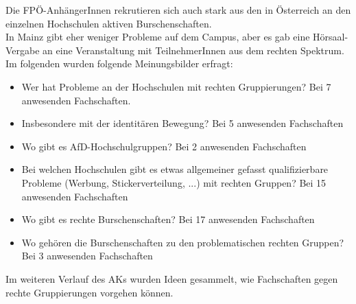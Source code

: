 Die FPÖ-AnhängerInnen rekrutieren sich auch stark aus den in Österreich an den einzelnen Hochschulen aktiven Burschenschaften. \\
In Mainz gibt eher weniger Probleme auf dem Campus, aber es gab eine Hörsaal-Vergabe an eine Veranstaltung mit TeilnehmerInnen aus dem rechten Spektrum. \\
Im folgenden wurden folgende Meinungsbilder erfragt:
\begin{itemize}
\item Wer hat Probleme an der Hochschulen mit rechten Gruppierungen? Bei 7 anwesenden Fachschaften.
\item Insbesondere mit der identitären Bewegung? Bei 5 anwesenden Fachschaften
\item Wo gibt es AfD-Hochschulgruppen? Bei 2 anwesenden Fachschaften
\item Bei welchen Hochschulen gibt es etwas allgemeiner gefasst qualifizierbare Probleme (Werbung, Stickerverteilung, ...) mit rechten Gruppen? Bei 15 anwesenden Fachschaften
\item Wo gibt es rechte Burschenschaften? Bei 17 anwesenden Fachschaften
\item Wo gehören die Burschenschaften zu den problematischen rechten Gruppen? Bei 3 anwesenden Fachschaften
\end{itemize}

Im weiteren Verlauf des AKs wurden Ideen gesammelt, wie Fachschaften gegen rechte Gruppierungen vorgehen können.

